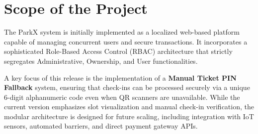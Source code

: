 \section{Scope of the Project}
The ParkX system is initially implemented as a localized web-based platform capable of managing concurrent users and secure transactions. It incorporates a sophisticated Role-Based Access Control (RBAC) architecture that strictly segregates Administrative, Ownership, and User functionalities. 

A key focus of this release is the implementation of a \textbf{Manual Ticket PIN Fallback} system, ensuring that check-ins can be processed securely via a unique 6-digit alphanumeric code even when QR scanners are unavailable. While the current version emphasizes slot visualization and manual check-in verification, the modular architecture is designed for future scaling, including integration with IoT sensors, automated barriers, and direct payment gateway APIs.
